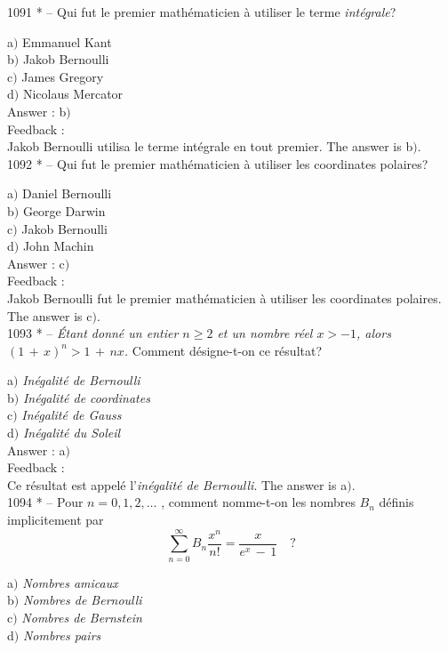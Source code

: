 ﻿\documentclass[letterpaper, 12pt]{article}
\begin{document}
1091 * -- Qui fut le premier math\'ematicien \`a utiliser le terme
{\sl int\'egrale}?

a$)$ Emmanuel Kant \\
b$)$ Jakob Bernoulli  \\
c$)$ James Gregory  \\
d$)$ Nicolaus Mercator\\

Answer : b$)$\\

Feedback : \\
Jakob Bernoulli utilisa le terme int\'egrale en tout premier.
The answer is b$)$.\\

1092 * -- Qui fut le premier math\'ematicien \`a utiliser les
coordinates polaires?

a$)$ Daniel Bernoulli \\
b$)$ George Darwin  \\
c$)$ Jakob Bernoulli  \\
d$)$ John Machin\\

Answer : c$)$\\

Feedback : \\
Jakob Bernoulli fut le premier math\'ematicien \`a utiliser les
coordinates polaires.
The answer is c$)$.\\

1093 * -- {\sl \'Etant donn\'e un entier $n\ge2$ et un nombre r\'eel
$x>-1$, alors $(1\,+\,x)^n>1\,+\,nx$.} Comment d\'esigne-t-on ce
r\'esultat?

a$)$ {\sl In\'egalit\'e de Bernoulli} \\
b$)$ {\sl In\'egalit\'e de coordinates}  \\
c$)$ {\sl In\'egalit\'e de Gauss}  \\
d$)$ {\sl In\'egalit\'e du Soleil}\\

Answer : a$)$\\

Feedback : \\
Ce r\'esultat est appel\'e l'{\sl in\'egalit\'e de Bernoulli}.
The answer is a$)$.\\

1094 * -- Pour $n=0,1,2,\ldots$ , comment nomme-t-on les nombres
$B_n$ d\'efinis implicitement par
$$\displaystyle{\sum_{n=0}^{\infty}B_n\frac{x^n}{n!}=\frac
x{e^x\,-\,1}}\quad ?$$

a$)$ {\sl Nombres amicaux} \\
b$)$ {\sl Nombres de Bernoulli}  \\
c$)$ {\sl Nombres de Bernstein}  \\
d$)$ {\sl Nombres pairs}\\
\end{document}
